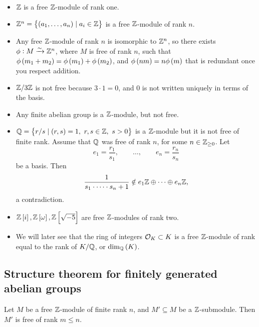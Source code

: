 \begin{example*}
\hfill
\begin{itemize}
\item $ \mathbb{Z} $ is a free $ \mathbb{Z} $-module of rank one.
\item $ \Z^n = \cbr{\br{a_1, \dots, a_n} \mid a_i \in \Z} $ is a free $ \mathbb{Z} $-module of rank $ n $.
\item Any free $ \mathbb{Z} $-module of rank $ n $ is isomorphic to $ \mathbb{Z}^n $, so there exists $ \phi : M \xrightarrow{\sim} \mathbb{Z}^n $, where $ M $ is free of rank $ n $, such that $ \phi\br{m_1 + m_2} = \phi\br{m_1} + \phi\br{m_2} $, and $ \phi\br{nm} = n\phi\br{m} $ that is redundant once you respect addition.
\item $ \mathbb{Z} / 3\mathbb{Z} $ is not free because $ 3 \cdot 1 = 0 $, and $ 0 $ is not written uniquely in terms of the basis.
\item Any finite abelian group is a $ \mathbb{Z} $-module, but not free.
\item $ \Q = \cbr{r / s \mid \br{r, s} = 1, \ r, s \in \Z, \ s > 0} $ is a $ \mathbb{Z} $-module but it is not free of finite rank. Assume that $ \mathbb{Q} $ was free of rank $ n $, for some $ n \in \mathbb{Z}_{\ge 0} $. Let
$$ e_1 = \dfrac{r_1}{s_1}, \qquad \dots, \qquad e_n = \dfrac{r_n}{s_n} $$
be a basis. Then
$$ \dfrac{1}{s_1 \cdot \dots \cdot s_n + 1} \notin e_1\mathbb{Z} \oplus \dots \oplus e_n\mathbb{Z}, $$
a contradiction.
\item $ \Z\sbr{i}, \Z\sbr{\omega}, \Z\sbr{\sqrt{-5}} $ are free $ \mathbb{Z} $-modules of rank two.
\item We will later see that the ring of integers $ \mathcal{O}_K \subset K $ is a free $ \mathbb{Z} $-module of rank equal to the rank of $ K / \mathbb{Q} $, or $ \dim_\Q\br{K} $.
\end{itemize}
\end{example*}

\pagebreak

\subsection{Structure theorem for finitely generated abelian groups}

\begin{theorem}
Let $ M $ be a free $ \mathbb{Z} $-module of finite rank $ n $, and $ M' \subseteq M $ be a $ \mathbb{Z} $-submodule. Then $ M' $ is free of rank $ m \le n $.
\end{theorem}

